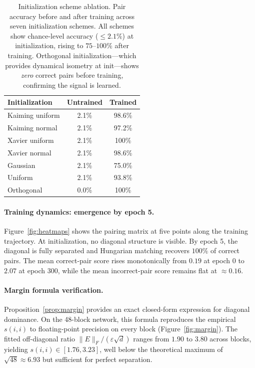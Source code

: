 \documentclass[wcp]{jmlr}
\begin{document}
\begin{table}[h]
\centering
\small
\begin{tabular}{lcc}
\toprule
Initialization & Untrained & Trained \\
\midrule
Kaiming uniform & 2.1\% & 98.6\% \\
Kaiming normal & 2.1\% & 97.2\% \\
Xavier uniform & 2.1\% & 100\% \\
Xavier normal & 2.1\% & 98.6\% \\
Gaussian & 2.1\% & 75.0\% \\
Uniform & 2.1\% & 93.8\% \\
Orthogonal & 0.0\% & 100\% \\
\bottomrule
\end{tabular}
\caption{Initialization scheme ablation. Pair accuracy before and after training across seven initialization schemes. All schemes show chance-level accuracy (${\leq}2.1\%$) at initialization, rising to $75$--$100\%$ after training. Orthogonal initialization---which provides dynamical isometry at init---shows \emph{zero} correct pairs before training, confirming the signal is learned.}
\label{tab:init_ablation}
\end{table}

\paragraph{Training dynamics: emergence by epoch 5.}
Figure~\ref{fig:heatmaps} shows the pairing matrix at five points along the training trajectory. At initialization, no diagonal structure is visible. By epoch 5, the diagonal is fully separated and Hungarian matching recovers $100\%$ of correct pairs. The mean correct-pair score rises monotonically from $0.19$ at epoch 0 to $2.07$ at epoch 300, while the mean incorrect-pair score remains flat at ${\approx}0.16$.

\paragraph{Margin formula verification.}
Proposition~\ref{prop:margin} provides an exact closed-form expression for diagonal dominance. On the 48-block network, this formula reproduces the empirical $s(i,i)$ to floating-point precision on every block (Figure~\ref{fig:margin}). The fitted off-diagonal ratio $\|E\|_F/(\varepsilon\sqrt{d})$ ranges from $1.90$ to $3.80$ across blocks, yielding $s(i,i) \in [1.76, 3.23]$, well below the theoretical maximum of $\sqrt{48} \approx 6.93$ but sufficient for perfect separation.
\end{document}

